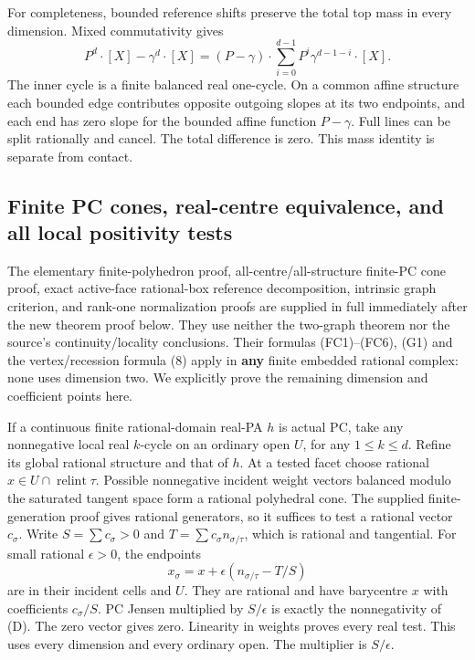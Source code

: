 \documentclass[
  11pt,
]{article}
\begin{document}
For completeness, bounded reference shifts preserve the total top mass
in every dimension. Mixed commutativity gives \[
 P^d\cdot[X]-\gamma^d\cdot[X]
 =(P-\gamma)\cdot\sum_{i=0}^{d-1}P^i\gamma^{d-1-i}\cdot[X].
 \tag{M}
\] The inner cycle is a finite balanced real one-cycle. On a common
affine structure each bounded edge contributes opposite outgoing slopes
at its two endpoints, and each end has zero slope for the bounded affine
function \(P-\gamma\). Full lines can be split rationally and cancel.
The total difference is zero. This mass identity is separate from
contact.

\subsection{Finite PC cones, real-centre equivalence, and all local
positivity
tests}\label{finite-pc-cones-real-centre-equivalence-and-all-local-positivity-tests}

The elementary finite-polyhedron proof, all-centre/all-structure
finite-PC cone proof, exact active-face rational-box reference
decomposition, intrinsic graph criterion, and rank-one normalization
proofs are supplied in full immediately after the new theorem proof
below. They use neither the two-graph theorem nor the source's
continuity/locality conclusions. Their formulas (FC1)--(FC6), (G1) and
the vertex/recession formula (8) apply in \textbf{any} finite embedded
rational complex: none uses dimension two. We explicitly prove the
remaining dimension and coefficient points here.

If a continuous finite rational-domain real-PA \(h\) is actual PC, take
any nonnegative local real \(k\)-cycle on an ordinary open \(U\), for
any \(1\leq k\leq d\). Refine its global rational structure and that of
\(h\). At a tested facet choose rational
\(x\in U\cap\operatorname{relint}\tau\). Possible nonnegative incident
weight vectors balanced modulo the saturated tangent space form a
rational polyhedral cone. The supplied finite-generation proof gives
rational generators, so it suffices to test a rational vector
\(c_\sigma\). Write \(S=\sum c_\sigma>0\) and
\(T=\sum c_\sigma n_{\sigma/\tau}\), which is rational and tangential.
For small rational \(\epsilon>0\), the endpoints \[
              x_\sigma=x+\epsilon(n_{\sigma/\tau}-T/S)
\] are in their incident cells and \(U\). They are rational and have
barycentre \(x\) with coefficients \(c_\sigma/S\). PC Jensen multiplied
by \(S/\epsilon\) is exactly the nonnegativity of (D). The zero vector
gives zero. Linearity in weights proves every real test. This uses every
dimension and every ordinary open. The multiplier is \(S/\epsilon\).
\end{document}
